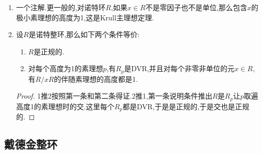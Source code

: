 \begin{enumerate}
\begin{proof}
		最后说明$\mathrm{ht}(p)=1$,只需验证作为$R$的分式理想,它是可逆的(我们证明过如果$p$是诺特整环的非零素理想,如果它可逆,那么它的高度1).但是按照$zp=R$,说明$z\in p^{-1}$,于是$pp^{-1}=R$,得证.
	\end{proof}
	\item 一个注解.更一般的,对诺特环$R$,如果$x\in R$不是零因子也不是单位,那么包含$x$的极小素理想的高度为1,这是Krull主理想定理.
	\item 设$R$是诺特整环,那么如下两个条件等价:
	\begin{enumerate}
		\item $R$是正规的.
		\item 对每个高度为1的素理想$p$,有$R_p$是DVR,并且对每个非零非单位的元$x\in R$,有$R/xR$的伴随素理想的高度都是1.
	\end{enumerate}
	\begin{proof}
		
		1推2按照第一条和第二条得证.2推1,第一条说明条件推出$R$是$R_p$让$p$取遍高度1的素理想时的交.这里每个$R_p$都是DVR,于是是正规的,于是交也是正规的.
	\end{proof}
\end{enumerate}
\newpage
\subsection{戴德金整环}

